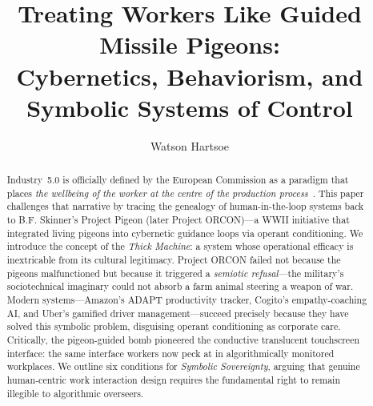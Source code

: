 \documentclass[runningheads]{llncs}
\begin{document}
\title{Treating Workers Like Guided Missile Pigeons:\\
Cybernetics, Behaviorism, and Symbolic Systems of Control}


\author{Watson Hartsoe}


\maketitle

\begin{abstract}
Industry~5.0 is officially defined by the European Commission as a paradigm
that places \emph{the wellbeing of the worker at the centre of the production
process}~\cite{breque2021industry}. This paper challenges that narrative by
tracing the genealogy of human-in-the-loop systems back to B.F. Skinner's
Project Pigeon (later Project ORCON)---a WWII initiative that integrated living
pigeons into cybernetic guidance loops via operant conditioning. We introduce
the concept of the \emph{Thick Machine}: a system whose operational efficacy is
inextricable from its cultural legitimacy. Project ORCON failed not because the
pigeons malfunctioned but because it triggered a \emph{semiotic refusal}---the
military's sociotechnical imaginary could not absorb a farm animal steering a
weapon of war. Modern systems---Amazon's ADAPT productivity tracker, Cogito's
empathy-coaching AI, and Uber's gamified driver management---succeed precisely
because they have solved this symbolic problem, disguising operant conditioning
as corporate care. Critically, the pigeon-guided bomb pioneered the conductive
translucent touchscreen interface: the same interface workers now peck at in
algorithmically monitored workplaces. We outline six conditions for
\emph{Symbolic Sovereignty}, arguing that genuine human-centric work
interaction design requires the fundamental right to remain illegible to
algorithmic overseers.
\end{abstract}


\end{document}
